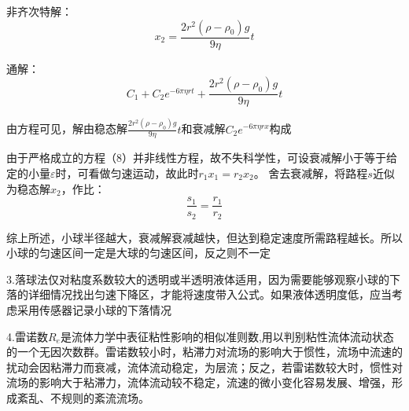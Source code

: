 \documentclass[UTF8]{ctexart}
\begin{document}
    非齐次特解：
    \begin{equation}
        x_2=\frac{2r^2(\rho -\rho _0)g}{9\eta}t
    \end{equation}
    
     通解：
    \begin{equation}
        C_1+C_2e^{-6\pi \eta rt}+\frac{2r^2(\rho -\rho _0)g}{9\eta}t 
    \end{equation}

    由方程可见，解由稳态解$\frac{2r^2(\rho -\rho _0)g}{9\eta}t$和衰减解$C_2e^{-6\pi \eta rx}$构成

    由于严格成立的方程（8）并非线性方程，故不失科学性，可设衰减解小于等于给定的小量$\varepsilon $时，可看做匀速运动，故此时$r_1x_1=r_2x_2$。
    舍去衰减解，将路程$s$近似为稳态解$x_2$，作比：
    \begin{equation*}
        \frac{s_1}{s_2}=\frac{r_1}{r_2}
    \end{equation*}

    综上所述，小球半径越大，衰减解衰减越快，但达到稳定速度所需路程越长。所以小球的匀速区间一定是大球的匀速区间，反之则不一定
    
    3.落球法仅对粘度系数较大的透明或半透明液体适用，因为需要能够观察小球的下落的详细情况找出匀速下降区，才能将速度带入公式。如果液体透明度低，应当考虑采用传感器记录小球的下落情况

    4.雷诺数$R_e$是流体力学中表征粘性影响的相似准则数,用以判别粘性流体流动状态的一个无因次数群。雷诺数较小时，粘滞力对流场的影响大于惯性，流场中流速的扰动会因粘滞力而衰减，流体流动稳定，为层流；反之，若雷诺数较大时，惯性对流场的影响大于粘滞力，流体流动较不稳定，流速的微小变化容易发展、增强，形成紊乱、不规则的紊流流场。
    \nocite{daolun}
    \nocite{shiyanjiaocheng}
    \nocite{dawushiyan}
    
\end{document}
